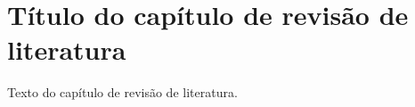 \chapter{Título do capítulo de revisão de literatura}\label{capitulo2}

Texto do capítulo de revisão de literatura.